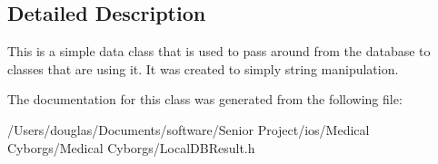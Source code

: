 \subsection{Detailed Description}
This is a simple data class that is used to pass around from the database to classes that are using it. It was created to simply string manipulation. 

The documentation for this class was generated from the following file\-:\begin{DoxyCompactItemize}
\item 
/\-Users/douglas/\-Documents/software/\-Senior Project/ios/\-Medical Cyborgs/\-Medical Cyborgs/Local\-D\-B\-Result.\-h\end{DoxyCompactItemize}
